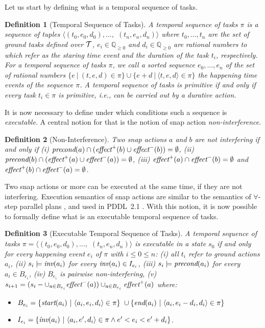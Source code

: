 \documentclass[letterpaper]{article} %
\newtheorem{definition}{Definition}
\newcommand{\pre}{\text{\it precond}}
\newcommand{\add}{\text{\it effect}^{+}}
\newcommand{\del}{\text{\it effect}^{-}}
\newcommand{\tstart}{\text{\it start}}
\newcommand{\tend}{\text{\it end}}
\newcommand{\tinv}{\text{\it inv}}
\begin{document}
Let us start by defining what is a temporal sequence of tasks. 
\begin{definition}[Temporal Sequence of Tasks]
A {\it temporal sequence of tasks} $\pi$ is a sequence of tuples $\langle (t_0, e_0, d_0), \ldots,$ $(t_n, e_n, d_n) \rangle$ where $t_0, \ldots, t_n$ are the set of ground tasks defined over $\cal{T}$, $e_i \in \mathbb{Q}_{\geq 0}$ and $d_i \in \mathbb{Q}_{\geq 0}$ are rational numbers to which refer as the staring time event and the duration of the task $t_i$, respectively. For a temporal sequence of tasks $\pi$, we call a sorted sequence $e_0, \ldots, e_n$ of the set of rational numbers $\{e \ | \ (t, e, d) \in \pi\} \cup \{e + d \ | \ \langle t, e, d \rangle \in \pi\}$ the happening time events of the sequence $\pi$. %
A temporal sequence of tasks is primitive if and only if every task $t_i \in \pi$ is primitive, i.e., can be carried out by a durative action.
\end{definition}

It is now necessary to define under which conditions such a sequence is {\it executable}. A central notion for that is the notion of snap action {\it non-interference}.
\begin{definition}[Non-Interference]
Two snap actions $a$ and $b$ are not interfering if and only if (i) $\pre(a) \cap (\add(b) \cup \del(b)) = \emptyset$, (ii) $\pre(b) \cap (\add(a) \cup \del(a)) = \emptyset$, (iii) $\add(a) \cap \del(b) = \emptyset$ and  $\add(b) \cap \del(a) = \emptyset$. 
\end{definition}
Two snap actions or more can be executed at the same time, if they are not interfering. Execution semantics of snap actions are similar to the semantics of $\forall$-step parallel plans \cite{rintanen06}, and used in PDDL~2.1 \cite{fox03}. With this notion, it is now possible to formally define what is an executable temporal sequence of tasks.

\begin{definition}[Executable Temporal Sequence of Tasks]
A temporal sequence of tasks $\pi = \langle (t_0, e_0, d_0), \ldots,$ $(t_n, e_n, d_n) \rangle$ is executable in a state $s_0$ if and only for every happening event $e_i$ of $\pi$ with $i \leq 0 \leq n$: (i) all $t_i$ refer to ground actions $a_i$, (ii) $s_i \models \tinv(a_i)$ for every $\tinv(a_i) \in I_{e_i}$, (iii) $s_i \models \pre(a_i)$ for every $a_i \in B_{e_i}$, (iv) $B_{e_i}$ is {\em pairwise non-interfering}, (v) $s_{i+1} = (s_i - \cup_{a \in B_{e_i}} \del(a)) \cup_{a \in B_{e_i}} \add(a)$
 where:
\begin{itemize}
 \item $B_{e_i} = \{ \tstart(a_i) \ | \ \langle a_i, e_i, d_i \rangle \in \pi\} \ \cup  \{\tend(a_i) \ | \ \langle a_i, e_i - d_i, d_i \rangle \in \pi\}$ 
 \item $I_{e_i} = \{ \tinv(a_i) \ | \ \langle a_i,e',d_i\rangle \in \pi \wedge e' < e_i < e' + d_i\}$.
 \end{itemize}
 \end{definition}
 
\end{document}
